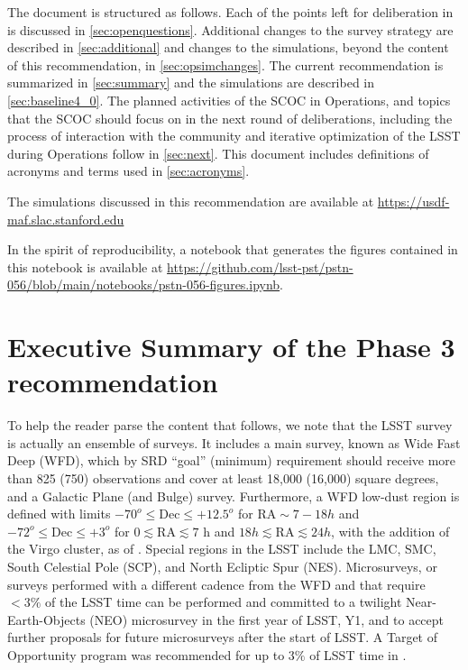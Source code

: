 The document is structured as follows.
Each of the points left for deliberation in   is discussed in \autoref{sec:openquestions}. 
Additional changes to the survey strategy are described in \autoref{sec:additional} and changes to the simulations, beyond the content of this recommendation, in \autoref{sec:opsimchanges}. 
The current recommendation is summarized in \autoref{sec:summary} and the  simulations are described in \autoref{sec:baseline4_0}.
The planned activities of the SCOC in Operations, and topics that the SCOC should focus on in the next round of deliberations, including the process of interaction with the community and iterative optimization of the LSST during Operations follow in \autoref{sec:next}.
This document includes definitions of acronyms and terms used in \autoref{sec:acronyms}.

The simulations discussed in this recommendation are available at \url{https://usdf-maf.slac.stanford.edu}

In the spirit of reproducibility, a notebook that generates the figures contained in this notebook is available at \url{https://github.com/lsst-pst/pstn-056/blob/main/notebooks/pstn-056-figures.ipynb}.

\clearpage

\section{Executive Summary of the Phase 3 recommendation}


To help the reader parse the content that follows, we note that the LSST survey is actually an ensemble of surveys. It includes a main survey, known as Wide Fast Deep (WFD), which by SRD ``goal'' (minimum) requirement should receive more than 825 (750) observations and cover at least 18,000 (16,000) square degrees, and a Galactic Plane (and Bulge) survey. Furthermore, a WFD low-dust region is defined with limits $-70^o \leq \mathrm{Dec} \leq +12.5^o$ for 
$\mathrm{RA} \sim   7-18 h$ and $-72^o \leq \mathrm{Dec}\leq +3^o$
for $0 \lesssim \mathrm{RA} \lesssim 7$ h and $18 h \lesssim \mathrm{RA} \lesssim 24 h$, with the addition of the Virgo cluster, as of .  Special regions in the LSST include the LMC, SMC, South Celestial Pole (SCP), and North Ecliptic Spur (NES). Microsurveys, or surveys performed with a different cadence from the WFD and that require $<3\%$ of the LSST time can be performed and  committed to a twilight Near-Earth-Objects (NEO) microsurvey in the first year of LSST, Y1, and to accept further proposals for future microsurveys after the start of LSST. A Target of Opportunity program was recommended for up to $3\%$ of LSST time in .

